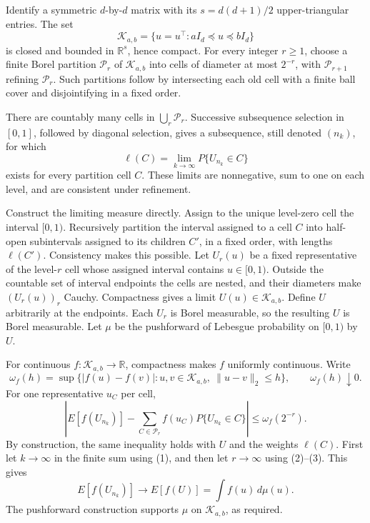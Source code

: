 Identify a symmetric \(d\)-by-\(d\) matrix with its \(s=d(d+1)/2\) upper-triangular entries. The set
\[
 \mathcal K_{a,b}=\{u=u^\top:aI_d\preceq u\preceq bI_d\}
\]
is closed and bounded in \(\mathbb R^s\), hence compact. For every integer \(r\ge1\), choose a finite Borel partition \(\mathcal P_r\) of \(\mathcal K_{a,b}\) into cells of diameter at most \(2^{-r}\), with \(\mathcal P_{r+1}\) refining \(\mathcal P_r\). Such partitions follow by intersecting each old cell with a finite ball cover and disjointifying in a fixed order.

There are countably many cells in \(\bigcup_r\mathcal P_r\). Successive subsequence selection in \([0,1]\), followed by diagonal selection, gives a subsequence, still denoted \((n_k)\), for which
\[
 \ell(C)=\lim_{k\to\infty}P\{U_{n_k}\in C\}
\tag{1}
\]
exists for every partition cell \(C\). These limits are nonnegative, sum to one on each level, and are consistent under refinement.

Construct the limiting measure directly. Assign to the unique level-zero cell the interval \([0,1)\). Recursively partition the interval assigned to a cell \(C\) into half-open subintervals assigned to its children \(C'\), in a fixed order, with lengths \(\ell(C')\). Consistency makes this possible. Let \(U_r(u)\) be a fixed representative of the level-\(r\) cell whose assigned interval contains \(u\in[0,1)\). Outside the countable set of interval endpoints the cells are nested, and their diameters make \((U_r(u))_r\) Cauchy. Compactness gives a limit \(U(u)\in\mathcal K_{a,b}\). Define \(U\) arbitrarily at the endpoints. Each \(U_r\) is Borel measurable, so the resulting \(U\) is Borel measurable. Let \(\mu\) be the pushforward of Lebesgue probability on \([0,1)\) by \(U\).

For continuous \(f:\mathcal K_{a,b}\to\mathbb R\), compactness makes \(f\) uniformly continuous. Write
\[
 \omega_f(h)=\sup\{|f(u)-f(v)|:u,v\in\mathcal K_{a,b},\
 \|u-v\|_2\le h\},\qquad \omega_f(h)\downarrow0.
\tag{2}
\]
For one representative \(u_C\) per cell,
\[
 \left|E[f(U_{n_k})]-\sum_{C\in\mathcal P_r}
 f(u_C)P\{U_{n_k}\in C\}\right|\le\omega_f(2^{-r}).
\tag{3}
\]
By construction, the same inequality holds with \(U\) and the weights \(\ell(C)\). First let \(k\to\infty\) in the finite sum using (1), and then let \(r\to\infty\) using (2)--(3). This gives
\[
 E[f(U_{n_k})]\longrightarrow E[f(U)]=\int f(u)\,d\mu(u).
\]
The pushforward construction supports \(\mu\) on \(\mathcal K_{a,b}\), as required.